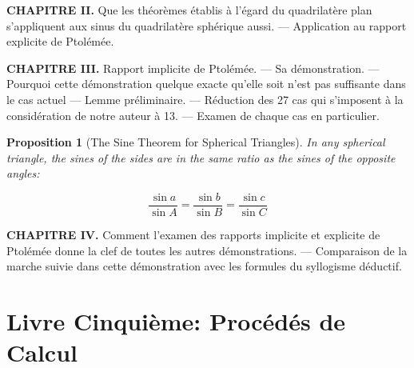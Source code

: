\documentclass[11pt,a4paper]{article}
\theoremstyle{plain}
\newtheorem{proposition}{Proposition}[section]
\theoremstyle{definition}
\theoremstyle{remark}
\begin{document}
\label{sec:ptolemy}





\textbf{CHAPITRE II.} Que les théorèmes établis à l'égard du quadrilatère plan s'appliquent aux sinus du quadrilatère sphérique aussi. --- Application au rapport explicite de Ptolémée.



\textbf{CHAPITRE III.} Rapport implicite de Ptolémée. --- Sa démonstration. --- Pourquoi cette démonstration quelque exacte qu'elle soit n'est pas suffisante dans le cas actuel --- Lemme préliminaire. --- Réduction des 27 cas qui s'imposent à la considération de notre auteur à 13. --- Examen de chaque cas en particulier.





\begin{proposition}[The Sine Theorem for Spherical Triangles]

In any spherical triangle, the sines of the sides are in the same ratio as the sines of the opposite angles:

\[

\frac{\sin a}{\sin A} = \frac{\sin b}{\sin B} = \frac{\sin c}{\sin C}

\]

\end{proposition}





\textbf{CHAPITRE IV.} Comment l'examen des rapports implicite et explicite de Ptolémée donne la clef de toutes les autres démonstrations. --- Comparaison de la marche suivie dans cette démonstration avec les formules du syllogisme déductif.





\clearpage






\section{Livre Cinquième: Procédés de Calcul}

\label{sec:livre5}
\end{document}
